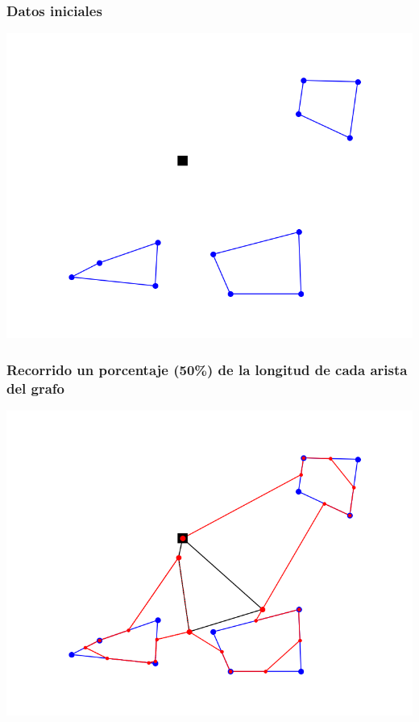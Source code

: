 \documentclass[slidestop,usepdftitle=false, xcolor=table]{beamer}
\begin{document}
	\begin{frame}
		\frametitle{Datos iniciales}
		\begin{center}
			\includegraphics[width=0.8\linewidth]{PDMTZ_1}
		\end{center}
	\end{frame}

	\begin{frame}
		\frametitle{Recorrido un porcentaje (50\%) de la longitud de cada arista del grafo}
		\begin{center}
			\includegraphics[width=0.8\linewidth]{PDMTZ_e}
		\end{center}
	\end{frame}
\end{document}
